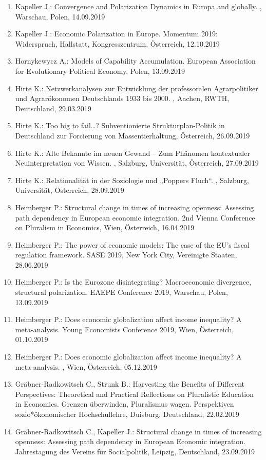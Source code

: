 \begin{enumerate}
	\item Kapeller J.: Convergence and Polarization Dynamics in Europa and globally. , Warschau, Polen, 14.09.2019
	\item Kapeller J.: Economic Polarization in Europe. Momentum 2019: Widerspruch, Hallstatt, Kongresszentrum, Österreich, 12.10.2019
	\item Hornykewycz A.: Models of Capability Accumulation. European Association for Evolutionary Political Economy, Polen, 13.09.2019
	\item Hirte K.: Netzwerkanalysen zur Entwicklung der professoralen Agrarpolitiker und Agrarökonomen Deutschlands 1933 bis 2000. , Aachen, RWTH, Deutschland, 29.03.2019
	\item Hirte K.: Too big to fail…? Subventionierte Strukturplan-Politik in Deutschland zur Forcierung von Massentierhaltung, Österreich, 26.09.2019
	\item Hirte K.: \glqq Alte Bekannte im neuen Gewand\grqq{} – Zum Phänomen kontextualer Neuinterpretation von Wissen. , Salzburg, Universität, Österreich, 27.09.2019
	\item Hirte K.: Relationalität in der Soziologie und „Poppers Fluch“. , Salzburg, Universität, Österreich, 28.09.2019
	\item Heimberger P.: Structural change in times of increasing openness: Assessing path dependency in European economic integration. 2nd Vienna Conference on Pluralism in Economics, Wien, Österreich, 16.04.2019
	\item Heimberger P.: The power of economic models: The case of the EU's fiscal regulation framework. SASE 2019, New York City, Vereinigte Staaten, 28.06.2019
	\item Heimberger P.: Is the Eurozone disintegrating? Macroeconomic divergence, structural polarization. EAEPE Conference 2019, Warschau, Polen, 13.09.2019
	\item Heimberger P.: Does economic globalization affect income inequality? A meta-analysis. Young Economists Conference 2019, Wien, Österreich, 01.10.2019
	\item Heimberger P.: Does economic globalization affect income inequality? A meta-analysis. , Wien, Österreich, 05.12.2019
	\item Gräbner-Radkowitsch C., Strunk B.: Harvesting the Benefits of Different Perspectives: Theoretical and Practical Reflections on Pluralistic Education in Economics. Grenzen überwinden, Pluralismus wagen. Perspektiven sozio*ökonomischer Hochschullehre, Duisburg, Deutschland, 22.02.2019
	\item Gräbner-Radkowitsch C., Kapeller J.: Structural change in times of increasing openness: Assessing path dependency in European Economic integration. Jahrestagung des Vereins für Socialpolitik, Leipzig, Deutschland, 23.09.2019

\end{enumerate}
